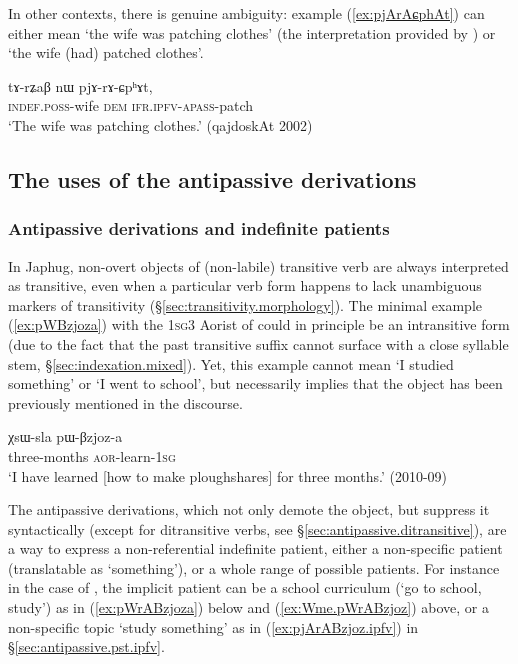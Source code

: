 In other contexts, there is genuine ambiguity: example (\ref{ex:pjArAɕphAt}) can either mean `the wife was patching clothes' (the interpretation provided by ) or `the wife (had) patched clothes'.

\begin{exe}
\ex \label{ex:pjArAɕphAt}
\gll tɤ-rʑaβ nɯ pjɤ-rɤ-ɕpʰɤt, \\
\textsc{indef}.\textsc{poss}-wife \textsc{dem} \textsc{ifr}.\textsc{ipfv}-\textsc{apass}-patch \\
\glt `The wife was patching clothes.' (qajdoskAt 2002) 
\end{exe}

  \subsection{The uses of the antipassive derivations } \label{sec:antipassive.function}

  \subsubsection{Antipassive derivations and indefinite patients } \label{sec:antipassive.indefinite.patient}
    
In Japhug, non-overt objects of (non-labile) transitive verb are always interpreted as transitive, even when a particular verb form happens to lack unambiguous markers of transitivity (§\ref{sec:transitivity.morphology}). The minimal example (\ref{ex:pWBzjoza}) with the \textsc{1sg}\fl{}3 Aorist of  could in principle be an intransitive form (due to the fact that the past transitive  suffix cannot surface with a close syllable stem, §\ref{sec:indexation.mixed}). Yet, this example cannot mean `I studied something' or `I went to school', but necessarily implies that the object has been previously mentioned in the discourse. 

\begin{exe}
\ex \label{ex:pWBzjoza}
\gll χsɯ-sla pɯ-βzjoz-a \\
three-months \textsc{aor}-learn-\textsc{1sg} \\
\glt `I have learned [how to make ploughshares] for three months.' (2010-09)
\end{exe}

The antipassive derivations, which not only demote the object, but suppress it syntactically (except for ditransitive verbs, see §\ref{sec:antipassive.ditransitive}), are a way to express a non-referential indefinite patient, either a non-specific patient (translatable as `something'), or a whole range of possible patients.  For instance in the case of , the implicit patient can be a school curriculum (`go to school, study')  as in (\ref{ex:pWrABzjoza}) below and (\ref{ex:Wme.pWrABzjoz}) above, or a non-specific topic `study something' as in (\ref{ex:pjArABzjoz.ipfv}) in §\ref{sec:antipassive.pst.ipfv}.

